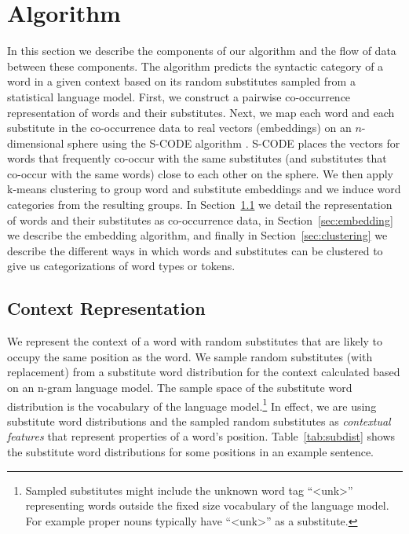 \section{Algorithm}

In this section we describe the components of our algorithm and the
flow of data between these components.  The algorithm predicts the
syntactic category of a word in a given context based on its random
substitutes sampled from a statistical language model.  First, we
construct a pairwise co-occurrence representation of words and their
substitutes.  Next, we map each word and each substitute in the
co-occurrence data to real vectors (embeddings) on an $n$-dimensional
sphere using the S-CODE algorithm \cite{maron2010sphere}.  S-CODE
places the vectors for words that frequently co-occur with the same
substitutes (and substitutes that co-occur with the same words) close
to each other on the sphere.  We then apply k-means clustering to
group word and substitute embeddings and we induce word categories
from the resulting groups.  In Section~\ref{sec:cooc} we detail the
representation of words and their substitutes as co-occurrence data,
in Section~\ref{sec:embedding} we describe the embedding algorithm,
and finally in Section~\ref{sec:clustering} we describe the different
ways in which words and substitutes can be clustered to give us
categorizations of word types or tokens.


\subsection{Context Representation}
\label{sec:cooc}

We represent the context of a word with random substitutes that are
likely to occupy the same position as the word.  We sample random
substitutes (with replacement) from a substitute word distribution for
the context calculated based on an n-gram language model.  The sample
space of the substitute word distribution is the vocabulary of the
language model.\footnote{Sampled substitutes might include the unknown
  word tag ``<unk>'' representing words outside the fixed size
  vocabulary of the language model.  For example proper nouns
  typically have ``<unk>'' as a substitute.}  In effect, we are using
substitute word distributions and the sampled random substitutes as
{\em contextual features} that represent properties of a word's
position.  Table~\ref{tab:subdist} shows the substitute word
distributions for some positions in an example sentence.

